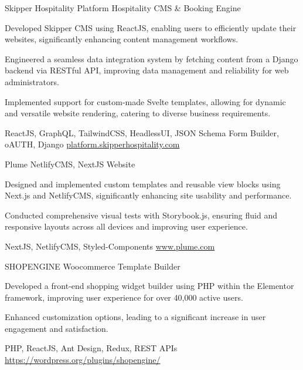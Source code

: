 
\begin{cventries}

  \cvproject
    {Skipper Hospitality Platform}
    {Hospitality CMS \& Booking Engine}
    {
      \begin{cvitems}
        \item {Developed Skipper CMS using ReactJS, enabling users to efficiently update their websites, significantly enhancing content management workflows.}
        \item {Engineered a seamless data integration system by fetching content from a Django backend via RESTful API, improving data management and reliability for web administrators.}
        \item {Implemented support for custom-made Svelte templates, allowing for dynamic and versatile website rendering, catering to diverse business requirements.}
      \end{cvitems}
    }
    {ReactJS, GraphQL, TailwindCSS, HeadlessUI, JSON Schema Form Builder, oAUTH, Django}
    {\href{https://platform.skipperhospitality.com/}{platform.skipperhospitality.com}}

  \cvproject
    {Plume}
    {NetlifyCMS, NextJS Website}
    {
      \begin{cvitems}
        \item {Designed and implemented custom templates and reusable view blocks using Next.js and NetlifyCMS, significantly enhancing site usability and performance.}
        \item {Conducted comprehensive visual tests with Storybook.js, ensuring fluid and responsive layouts across all devices and improving user experience.}
      \end{cvitems}
    }
    {NextJS, NetlifyCMS, Styled-Components}
    {\href{https://www.plume.com}{www.plume.com}}

  \cvproject
    {SHOPENGINE}
    {Woocommerce Template Builder}
    {
      \begin{cvitems}
        \item {Developed a front-end shopping widget builder using PHP within the Elementor framework, improving user experience for over 40,000 active users.}
        \item {Enhanced customization options, leading to a significant increase in user engagement and satisfaction.}
      \end{cvitems}
    }
    {PHP, ReactJS, Ant Design, Redux, REST APIs}
    {\href{https://wordpress.org/plugins/shopengine/}{https://wordpress.org/plugins/shopengine/}}

\end{cventries}
